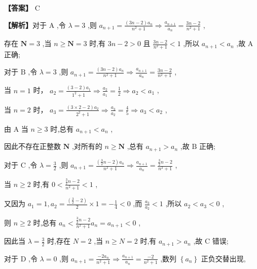 \documentclass[10pt]{article}
\begin{document}
\textbf{【答案】} C

\textbf{【解析】}对于 \(\mathrm{A}\) ,令 \(\lambda  = 3\) ,则 \({a}_{n + 1} = \frac{\left( {{3n} - 2}\right) {a}_{n}}{{n}^{2} + 1} \Rightarrow  \frac{{a}_{n + 1}}{{a}_{n}} = \frac{{3n} - 2}{{n}^{2} + 1}\) ,

存在 \(\mathbf{N} = 3\) ,当 \(n \geq  \mathbf{N} = 3\) 时,有 \({3n} - 2 > 0\) 且 \(\frac{{3n} - 2}{{n}^{2} + 1} < 1\) ,所以 \({a}_{n + 1} < {a}_{n}\) ,故 \(\mathrm{A}\) 正确;

对于 \(\mathrm{B}\) ,令 \(\lambda  = 3\) ,则 \({a}_{n + 1} = \frac{\left( {{3n} - 2}\right) {a}_{n}}{{n}^{2} + 1} \Rightarrow  \frac{{a}_{n + 1}}{{a}_{n}} = \frac{{3n} - 2}{{n}^{2} + 1}\) ,

当 \(n = 1\) 时， \({a}_{2} = \frac{\left( {3 - 2}\right) {a}_{1}}{{1}^{2} + 1} \Rightarrow  \frac{{a}_{2}}{{a}_{1}} = \frac{1}{2} \Rightarrow  {a}_{2} < {a}_{1}\) ,

当 \(n = 2\) 时， \({a}_{3} = \frac{\left( {3 \times  2 - 2}\right) {a}_{2}}{{2}^{2} + 1} \Rightarrow  \frac{{a}_{3}}{{a}_{2}} = \frac{4}{5} \Rightarrow  {a}_{3} < {a}_{2}\) ,

由 \(\mathrm{A}\) 当 \(n \geq  3\) 时,总有 \({a}_{n + 1} < {a}_{n}\) ,

因此不存在正整数 \(\mathbf{N}\) ,对所有的 \(n \geq  \mathbf{N}\) ,总有 \({a}_{n + 1} > {a}_{n}\) ,故 \(\mathrm{B}\) 正确;

对于 \(\mathrm{C}\) ,令 \(\lambda  = \frac{3}{2}\) ,则 \({a}_{n + 1} = \frac{\left( {\frac{3}{2}n - 2}\right) {a}_{n}}{{n}^{2} + 1} \Rightarrow  \frac{{a}_{n + 1}}{{a}_{n}} = \frac{\frac{3}{2}n - 2}{{n}^{2} + 1}\) ,

当 \(n \geq  2\) 时,有 \(0 < \frac{\frac{3}{2}n - 2}{{n}^{2} + 1} < 1\) ,

又因为 \({a}_{1} = 1,{a}_{2} = \frac{\left( \frac{3}{2} - 2\right) }{2} \times  1 =  - \frac{1}{4} < 0\) ,而 \(\frac{{a}_{3}}{{a}_{2}} < 1\) ,所以 \({a}_{2} < {a}_{3} < 0\) ,

则 \(n \geq  2\) 时,总有 \({a}_{n} < \frac{\frac{3}{2}n - 2}{{n}^{2} + 1}{a}_{n} = {a}_{n + 1} < 0\) ,

因此当 \(\lambda  = \frac{3}{2}\) 时,存在 \(N = 2\) ,当 \(n \geq  N = 2\) 时,有 \({a}_{n + 1} > {a}_{n}\) ,故 \(\mathrm{C}\) 错误;

对于 \(\mathrm{D}\) ,令 \(\lambda  = 0\) ,则 \({a}_{n + 1} = \frac{-2{a}_{n}}{{n}^{2} + 1} \Rightarrow  \frac{{a}_{n + 1}}{{a}_{n}} = \frac{-2}{{n}^{2} + 1}\) ,数列 \(\left\{  {a}_{n}\right\}\) 正负交替出现,
\end{document}
